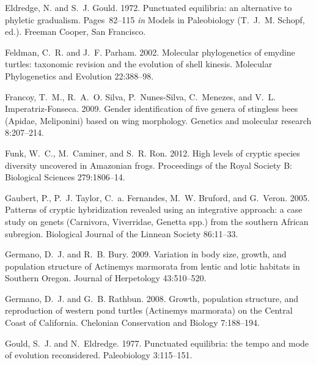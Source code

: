\documentclass[12pt,letterpaper]{article}
\begin{document}
\begin{thebibliography}{77}
Eldredge, N. and S.~J. Gould. 1972. {Punctuated equilibria: an alternative to
  phyletic gradualism}. Pages~82--115 \emph{in} Models in Paleobiology
  (T.~J.~M. Schopf, ed.). Freeman Cooper, San Francisco.

Feldman, C.~R. and J.~F. Parham. 2002. {Molecular phylogenetics of emydine
  turtles: taxonomic revision and the evolution of shell kinesis.} Molecular
  Phylogenetics and Evolution 22:388--98.

Francoy, T.~M., R.~A.~O. Silva, P.~Nunes-Silva, C.~Menezes, and V.~L.
  Imperatriz-Fonseca. 2009. {Gender identification of five genera of stingless
  bees (Apidae, Meliponini) based on wing morphology}. Genetics and molecular
  research 8:207--214.

Funk, W.~C., M.~Caminer, and S.~R. Ron. 2012. {High levels of cryptic species
  diversity uncovered in Amazonian frogs.} Proceedings of the Royal Society B:
  Biological Sciences 279:1806--14.

Gaubert, P., P.~J. Taylor, C.~a. Fernandes, M.~W. Bruford, and G.~Veron. 2005.
  {Patterns of cryptic hybridization revealed using an integrative approach: a
  case study on genets (Carnivora, Viverridae, Genetta spp.) from the southern
  African subregion}. Biological Journal of the Linnean Society 86:11--33.

Germano, D.~J. and R.~B. Bury. 2009. {Variation in body size, growth, and
  population structure of Actinemys marmorata from lentic and lotic habitats in
  Southern Oregon}. Journal of Herpetology 43:510--520.

Germano, D.~J. and G.~B. Rathbun. 2008. {Growth, population structure, and
  reproduction of western pond turtles (Actinemys marmorata) on the Central
  Coast of California}. Chelonian Conservation and Biology 7:188--194.

Gould, S.~J. and N.~Eldredge. 1977. {Punctuated equilibria: the tempo and mode
  of evolution reconsidered}. Paleobiology 3:115--151.


\end{thebibliography}
\end{document}
